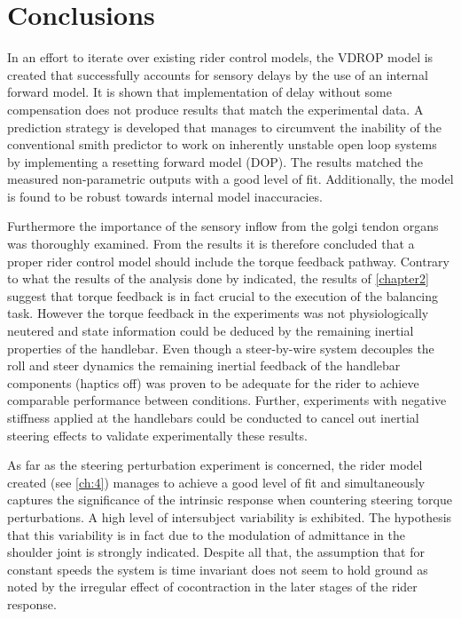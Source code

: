 \chapter{Conclusions}

In an effort to iterate over existing rider control models, the VDROP model is created that successfully accounts for sensory delays by the use of an internal forward model. It is shown that implementation of delay without some compensation does not produce results that match the experimental data.  A prediction strategy is developed that manages to  circumvent the inability of the conventional smith predictor to work on inherently unstable open loop systems by implementing a resetting forward model (DOP). The results matched the  measured non-parametric outputs with a good level of fit. Additionally, the model is found to be robust towards internal model inaccuracies. 

Furthermore the importance of the sensory inflow from the golgi tendon organs was thoroughly examined. From the results it is therefore concluded that a proper rider control model should include the torque feedback pathway. Contrary to what  the results of the analysis done by \citet{dialynaseffect} indicated, the results of \cref{chapter2} suggest that torque feedback is in fact crucial to the execution of the balancing task. However the torque feedback in the experiments was not physiologically neutered and  state information could be deduced by the remaining inertial properties of the handlebar. Even though a steer-by-wire system decouples the roll and steer dynamics the remaining inertial feedback of the handlebar components (haptics off) was proven to be adequate for the rider to achieve comparable performance between conditions. Further, experiments with negative stiffness applied at the handlebars could be conducted to cancel out inertial steering effects to validate experimentally these results.


As far as the steering perturbation experiment is concerned, the rider model created (see \cref{ch:4}) manages to achieve a good level of fit and simultaneously captures the significance of the intrinsic response when countering steering torque perturbations. A high level of intersubject variability is exhibited. The hypothesis that this variability is in fact due to the modulation of admittance in the shoulder joint is strongly indicated. Despite all that,  the assumption that for constant speeds the system is time invariant does not seem to hold ground as noted by the irregular effect of cocontraction in the later stages of the rider  response.